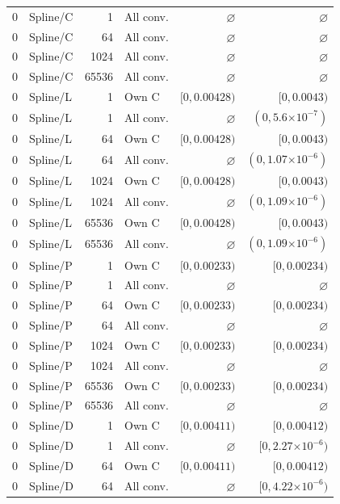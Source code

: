 \begin{longtable}{llrlrr}
0 & Spline/C & 1 & All conv. & $\varnothing$ & $\varnothing$ \\
0 & Spline/C & 64 & All conv. & $\varnothing$ & $\varnothing$ \\
0 & Spline/C & 1024 & All conv. & $\varnothing$ & $\varnothing$ \\
0 & Spline/C & 65536 & All conv. & $\varnothing$ & $\varnothing$ \\
0 & Spline/L & 1 & Own C & $[0, 0.00428)$ & $[0, 0.0043)$ \\
0 & Spline/L & 1 & All conv. & $\varnothing$ & $(0, 5.6\mathord{\times}10^{-7})$ \\
0 & Spline/L & 64 & Own C & $[0, 0.00428)$ & $[0, 0.0043)$ \\
0 & Spline/L & 64 & All conv. & $\varnothing$ & $(0, 1.07\mathord{\times}10^{-6})$ \\
0 & Spline/L & 1024 & Own C & $[0, 0.00428)$ & $[0, 0.0043)$ \\
0 & Spline/L & 1024 & All conv. & $\varnothing$ & $(0, 1.09\mathord{\times}10^{-6})$ \\
0 & Spline/L & 65536 & Own C & $[0, 0.00428)$ & $[0, 0.0043)$ \\
0 & Spline/L & 65536 & All conv. & $\varnothing$ & $(0, 1.09\mathord{\times}10^{-6})$ \\
0 & Spline/P & 1 & Own C & $[0, 0.00233)$ & $[0, 0.00234)$ \\
0 & Spline/P & 1 & All conv. & $\varnothing$ & $\varnothing$ \\
0 & Spline/P & 64 & Own C & $[0, 0.00233)$ & $[0, 0.00234)$ \\
0 & Spline/P & 64 & All conv. & $\varnothing$ & $\varnothing$ \\
0 & Spline/P & 1024 & Own C & $[0, 0.00233)$ & $[0, 0.00234)$ \\
0 & Spline/P & 1024 & All conv. & $\varnothing$ & $\varnothing$ \\
0 & Spline/P & 65536 & Own C & $[0, 0.00233)$ & $[0, 0.00234)$ \\
0 & Spline/P & 65536 & All conv. & $\varnothing$ & $\varnothing$ \\
0 & Spline/D & 1 & Own C & $[0, 0.00411)$ & $[0, 0.00412)$ \\
0 & Spline/D & 1 & All conv. & $\varnothing$ & $[0, 2.27\mathord{\times}10^{-6})$ \\
0 & Spline/D & 64 & Own C & $[0, 0.00411)$ & $[0, 0.00412)$ \\
0 & Spline/D & 64 & All conv. & $\varnothing$ & $[0, 4.22\mathord{\times}10^{-6})$ \\

\end{longtable}
